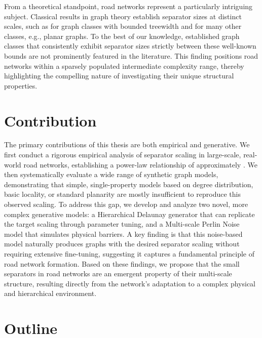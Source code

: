 From a theoretical standpoint, road networks represent a particularly intriguing subject.
Classical results in graph theory establish separator sizes at distinct scales, such as  for graph classes with bounded treewidth and  for many other classes, e.g., planar graphs.
To the best of our knowledge, established graph classes that consistently exhibit separator sizes strictly between these well-known bounds are not prominently featured in the literature.
This finding positions road networks within a sparsely populated intermediate complexity range, thereby highlighting the compelling nature of investigating their unique structural properties.

\section{Contribution}
\label{sec:contribution}

The primary contributions of this thesis are both empirical and generative.
We first conduct a rigorous empirical analysis of separator scaling in large-scale, real-world road networks, establishing a power-law relationship of approximately .
We then systematically evaluate a wide range of synthetic graph models, demonstrating that simple, single-property models based on degree distribution, basic locality, or standard planarity are mostly insufficient to reproduce this observed scaling.
To address this gap, we develop and analyze two novel, more complex generative models: a Hierarchical Delaunay generator that can replicate the target scaling through parameter tuning, and a Multi-scale Perlin Noise model that simulates physical barriers.
A key finding is that this noise-based model naturally produces graphs with the desired  separator scaling without requiring extensive fine-tuning, suggesting it captures a fundamental principle of road network formation.
Based on these findings, we propose that the small separators in road networks are an emergent property of their multi-scale structure, resulting directly from the network's adaptation to a complex physical and hierarchical environment.

\section{Outline}
\label{sec:outline}

